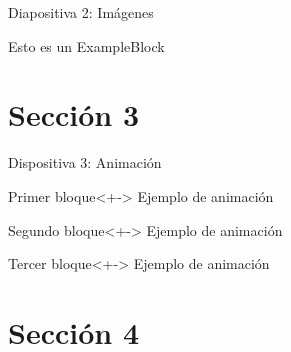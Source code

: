 \documentclass[10pt]{beamer}
\begin{document}
\begin{frame}{Diapositiva 2: Imágenes}
\begin{exampleblock}{Esto es un ExampleBlock}
\begin{center}
	\end{center}
	\end{exampleblock}
\end{frame}

\section{Sección 3}

\begin{frame}{Dispositiva 3: Animación}

	\begin{exampleblock}{Primer bloque}<+->
		Ejemplo de animación
	\end{exampleblock}
	
	\begin{exampleblock}{Segundo bloque}<+->
		Ejemplo de animación
	\end{exampleblock}
	
	\begin{exampleblock}{Tercer bloque}<+->
		Ejemplo de animación
	\end{exampleblock}
\end{frame}

\section{Sección 4}
\end{document}

